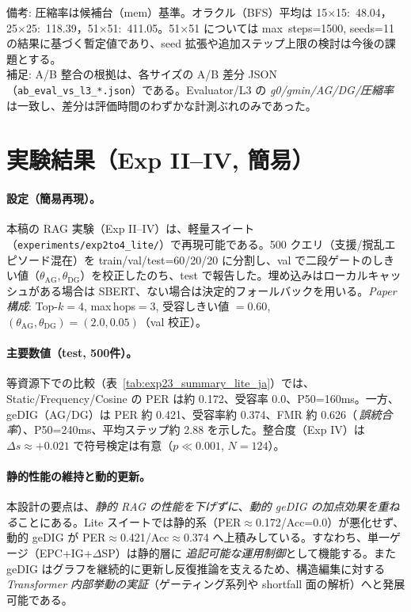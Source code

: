 \documentclass[ja=standard,xelatex]{bxjsarticle}
\begin{document}
  \noindent 備考: 圧縮率は候補台（mem）基準。オラクル（BFS）平均は 15×15:~48.04，25×25:~118.39，51×51:~411.05。51×51 については max~steps=1500, seeds=11 の結果に基づく暫定値であり、seed 拡張や追加ステップ上限の検討は今後の課題とする。\\
\noindent 補足: A/B 整合の根拠は、各サイズの A/B 差分 JSON（\texttt{ab\_eval\_vs\_l3\_*.json}）である。Evaluator/L3 の \emph{g0/gmin/AG/DG/圧縮率} は一致し、差分は評価時間のわずかな計測ぶれのみであった。

\section*{実験結果（Exp II--IV, 簡易）}\label{sec:exp_results_lite_ja}
\paragraph{設定（簡易再現）。} 本稿の RAG 実験（Exp II--IV）は、軽量スイート（\texttt{experiments/exp2to4\_lite/}）で再現可能である。500 クエリ（支援/撹乱エピソード混在）を train/val/test=60/20/20 に分割し、val で二段ゲートのしきい値（$\theta_{\mathrm{AG}},\theta_{\mathrm{DG}}$）を校正したのち、test で報告した。埋め込みはローカルキャッシュがある場合は SBERT、ない場合は決定的フォールバックを用いる。\;\textit{Paper 構成}: Top-$k{=}4$, max\,hops$=3$, 受容しきい値 $=0.60$, $(\theta_{\mathrm{AG}},\theta_{\mathrm{DG}}){=}(2.0,0.05)$（val 校正）。

\paragraph{主要数値（test, 500件）。} 等資源下での比較（表~\ref{tab:exp23_summary_lite_ja}）では、Static/Frequency/Cosine の PER は約 0.172、受容率 0.0、P50=160ms。一方、geDIG（AG/DG）は PER 約 0.421、受容率約 0.374、FMR 約 0.626（\,\emph{誤統合率}）、P50=240ms、平均ステップ約 2.88 を示した。整合度（Exp IV）は $\Delta s \approx +0.021$ で符号検定は有意（$p\ll0.001$, $N{=}124$）。

\paragraph{静的性能の維持と動的更新。} 本設計の要点は、\emph{静的 RAG の性能を下げずに}、\emph{動的 geDIG の加点効果を重ねる}ことにある。Lite スイートでは静的系（PER$\approx$0.172/Acc=0.0）が悪化せず、動的 geDIG が PER$\approx$0.421/Acc$\approx$0.374 へ上積みしている。すなわち、単一ゲージ（EPC+IG+$\Delta$SP）は静的層に \emph{追記可能な運用制御}として機能する。また geDIG はグラフを継続的に更新し反復推論を支えるため、構造編集に対する \emph{Transformer 内部挙動の実証}（ゲーティング系列や shortfall 面の解析）へと発展可能である。
\end{document}
